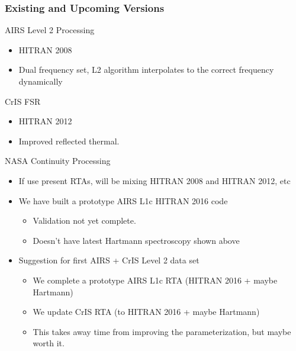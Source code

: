 \documentclass[10pt,t]{beamer}
\begin{document}
\begin{frame}[shrink=20]
  \frametitle{Existing and Upcoming Versions}

  \begin{block}{AIRS Level 2 Processing}
    \begin{itemize}
    \item HITRAN 2008
    \item Dual frequency set, L2 algorithm interpolates to the correct frequency  dynamically 
     \end{itemize}
  \end{block}
  \begin{block}{CrIS FSR}
    \begin{itemize}
    \item HITRAN 2012
    \item Improved reflected thermal.
     \end{itemize}
  \end{block}
  \begin{block}{NASA Continuity Processing}
    \begin{itemize}
    \item If use present RTAs, will be mixing HITRAN 2008 and HITRAN 2012, etc
    \item We have built a prototype AIRS L1c HITRAN 2016 code
      \begin{itemize}
      \item Validation not yet complete.
      \item Doesn't have latest Hartmann spectroscopy shown above
      \end{itemize}
    \item Suggestion for first AIRS + CrIS Level 2 data set
      \begin{itemize}
      \item We complete a prototype AIRS L1c RTA (HITRAN 2016 + maybe Hartmann)
      \item We update CrIS RTA (to HITRAN 2016 + maybe Hartmann)
      \item This takes away time from improving the parameterization, but maybe worth it.
      \end{itemize}
  
      

    \end{itemize}
  \end{block}
  
  
\end{frame}
\end{document}
